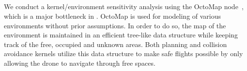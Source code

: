 \subsection{}  
\addtocounter{subsection}{-1}%
\DIFdelend \DIFaddbegin {}

\DIFaddend We conduct a kernel/environment sensitivity analysis using the OctoMap node~\cite{octomap}, which is a major bottleneck in \DIFdelbegin {}\DIFdelend \DIFaddbegin {}\DIFaddend . OctoMap is used for modeling of various environments without prior assumptions. In order to do so, the map of the environment is maintained in an efficient tree-like data structure while keeping track of the free, occupied and unknown areas. Both planning and collision avoidance kernels utilize this data structure to make safe flights possible by only allowing the drone to navigate through free spaces.  

\DIFdelbegin %
{%
}

{%
}%

